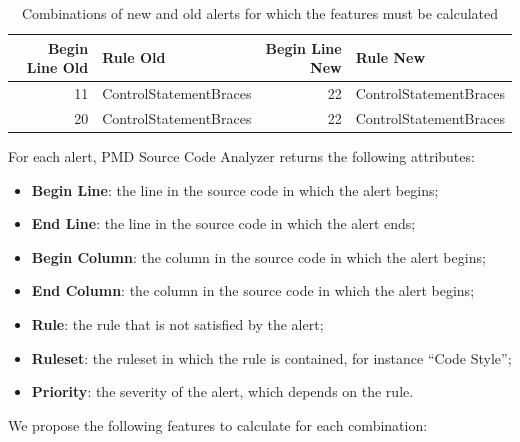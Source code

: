 \documentclass[
]{article}
\begin{document}
\small

\begin{table}[H]

\caption{\label{tab:unnamed-chunk-6}Combinations of new and old alerts for which the features must be calculated \label{combination}}
\centering
\begin{tabular}[t]{r|l|r|l}
\hline
Begin Line Old & Rule Old & Begin Line New & Rule New\\
\hline
11 & ControlStatementBraces & 22 & ControlStatementBraces\\
\hline
20 & ControlStatementBraces & 22 & ControlStatementBraces\\
\hline
\end{tabular}
\end{table}

\normalsize

\vspace{16pt}
For each alert, PMD Source Code Analyzer returns the following attributes:

\begin{itemize}
    \item \textbf{Begin Line}: the line in the source code in which the alert begins;
    
    \item \textbf{End Line}: the line in the source code in which the alert ends;
    
    \item \textbf{Begin Column}: the column in the source code in which the alert begins;
    
    \item \textbf{End Column}: the column in the source code in which the alert begins;
    
    \item \textbf{Rule}: the rule that is not satisfied by the alert;
    
    \item \textbf{Ruleset}: the ruleset in which the rule is contained, for instance ``Code Style'';

    \item \textbf{Priority}: the severity of the alert, which depends on the rule. 
\end{itemize}

\vspace{16pt}
We propose the following features to calculate for each combination:
\end{document}
